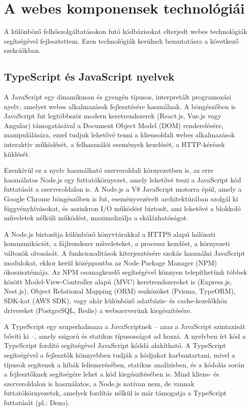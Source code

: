 \section{A webes komponensek technológiái}

A különböző felhőszolgáltatásokon futó kódbázisokat elterjedt webes technológiák segítségével fejlesztettem. Ezen technológiák kerülnek bemutatásra a következő szekciókban.

\subsection{TypeScript és JavaScript nyelvek}

A JavaScript egy dinamikusan és gyengén típusos, interpretált programozási nyelv, amelyet webes alkalmazások fejlesztésére használnak. A böngészőben is JavaScript fut legtöbbször modern keretrendszerek (React.js, Vue.js vagy Angular) támogatásával a Document Object Model (DOM) renderelésére, manipulálására, ezzel tudjuk lehetővé tenni a kliensoldali webes alkalmazások interaktív működését, a felhasználói események kezelését, a HTTP-kérések küldését.

Ezenkívül ez a nyelv használható szerveroldali környezetben is, az erre használatos Node.js egy futtatókörnyezet, amely lehetővé teszi a JavaScript kód futtatását a szerveroldalon is. A Node.js a V8 JavaScript motorra épül, amely a Google Chrome böngészőben is fut, eseményvezérelt architektúrában szolgál ki függvényhívásokat, és aszinkron I/O működést biztosít, ami lehetővé a blokkoló műveletek nélküli működést, maximalizálja a skálázhatóságot. \cite{Node}

A Node.js biztosítja különböző könyvtárakkal a HTTPS alapú hálózati kommunikációt, a fájlrendszer műveleteket, a processz kezelést, a környezeti változók olvasását. A funkcionalitások kiterjesztésére szokás használni JavaScript modulokat, ekkor kerül középpontba az Node Package Manager (NPM) ökoszisztémája. Az NPM csomagkezelő segítségével könnyen telepíthetünk többek között Model-View-Controller alapú (MVC) keretrendszereket is (Express.js, Nest.js), Object Relational Mapping (ORM) eszközöket (Prisma, TypeORM), SDK-kat (AWS SDK), vagy akár különböző adatbázis- és cache-kezelőkhöz drivereket (PostgreSQL, Redis) a webszerverünk kiegészítésére.

A TypeScript egy szuperhalmaza a JavaScriptnek -- azaz a JavaScript szintaxisát bővíti ki --, amely szigorú és statikus típusosságot ad hozzá. A nyelvben írt kód a TypeScript fordító segítségével JavaScript kóddá alakítható. A TypeScript segítségével a fejlesztők könnyebben tudják a kódjukat karbantartani, mivel a típusok segítenek a hibák felismerésében, statikus analízisben, és a kódolás során a fejlesztőknek segítségére lehet a kód kiegészítésében is. Mind kliens- és szerveroldalon is használatos, a Node.js natívan nem, de vannak futtatókörnyezetek, amelyek fordítás nélkül is már támogatja a TypeScript futtatását (pl.: Deno).

